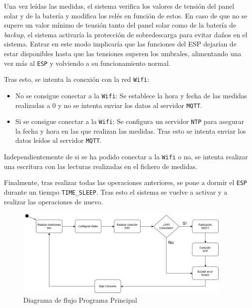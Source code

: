 Una vez leídas las medidas, el sistema verifica los valores de tensión del panel solar y de la batería y modifica los relés en función de estos.
En caso de que no se supere un valor mínimo de tensión tanto del panel solar como de la batería de \textit{backup}, el sistema activaría la protección de sobredescarga para evitar daños en el sistema. 
Entrar en este modo implicaría que las funciones del ESP dejarían de estar disponibles hasta que las tensiones superen los umbrales, alimentando una vez más al \texttt{ESP} y volviendo a su funcionamiento normal.

Tras esto, se intenta la conexión con la red \texttt{Wifi}:
\begin{itemize}
    \item No se consigue conectar a la \texttt{Wifi}: Se establece la hora y fecha de las medidas realizadas a 0 y no se intenta enviar los datos al servidor \texttt{MQTT}. 
    \item Si se consigue conectar a la \texttt{Wifi}: Se configura un servidor \texttt{NTP} para asegurar la fecha y hora en las que realizan las medidas. Tras esto se intenta enviar los datos leídos al servidor \texttt{MQTT}.
\end{itemize}

Independientemente de si se ha podido conectar a la \texttt{Wifi} o no, se intenta realizar una escritura con las lecturas realizadas en el fichero de medidas.

Finalmente, tras realizar todas las operaciones anteriores, se pone a dormir el \texttt{ESP} durante un tiempo \texttt{TIME\_SLEEP}. Tras esto el sistema se vuelve a activar y a realizar las operaciones de nuevo.

\begin{figure}[H]
    \centering
    \includegraphics[width=0.95\textwidth]{images/3-software/3-3-programaprincipal/DiagramaDeFlujoPOWER.jpg}
    \caption{Diagrama de flujo Programa Principal}
    \label{fig:3-3-1-DiagramaFlujo}
\end{figure}

